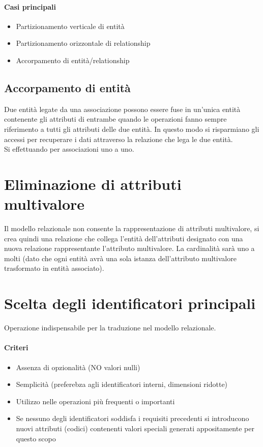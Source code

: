 \paragraph*{Casi principali}
\begin{itemize}
    \item Partizionamento verticale di entità
    \item Partizionamento orizzontale di relationship
    \item Accorpamento di entità/relationship
\end{itemize}
\subsection{Accorpamento di entità}
Due entità legate da una associazione possono essere fuse in un'unica entità
contenente gli attributi di entrambe quando le operazioni fanno sempre riferimento a tutti gli 
attributi delle due entità. In questo modo si risparmiano gli accessi per recuperare i dati
attraverso la relazione che lega le due entità.\\
Si effettuando per associazioni uno a uno.
\section{Eliminazione di attributi multivalore}
Il modello relazionale non consente la rappresentazione di attributi multivalore, si crea quindi
una relazione che collega l'entità dell'attributi designato con una nuova relazione rappresentante 
l'attributo multivalore. La cardinalità sarà uno a molti (dato che ogni entità avrà una sola
istanza dell'attributo multivalore trasformato in entità associato).
\section{Scelta degli identificatori principali}
Operazione indispensabile per la traduzione nel modello relazionale.
\paragraph*{Criteri}
\begin{itemize}
    \item Assenza di opzionalità (NO valori nulli)
    \item Semplicità (preferebza agli identificatori interni, dimensioni ridotte)
    \item Utilizzo nelle operazioni più frequenti o importanti
    \item Se nessuno degli identificatori soddisfa i requisiti precedenti si introducono
    nuovi attributi (codici) contenenti valori speciali generati appositamente per questo scopo
\end{itemize}

